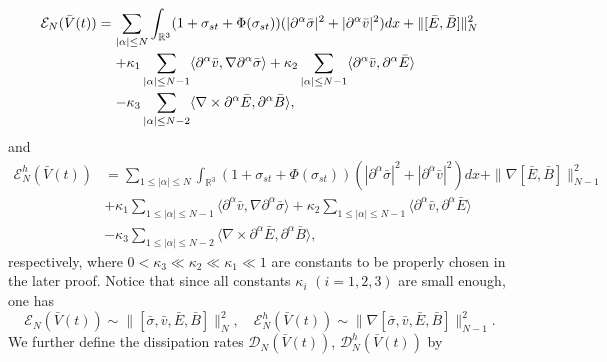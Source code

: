 \documentclass[11pt]{amsart}
\numberwithin{equation}{section}
\begin{document}
\begin{equation}\label{de.E}
\arraycolsep=1.5pt
\begin{array}{rl}
\mathcal{E}_{N}(\bar{V}(t))=&\displaystyle\sum_{|\alpha|\leq
N}\int_{\mathbb{R}^3}(1+\sigma_{st}+\Phi(\sigma_{st}))
(|\partial^{\alpha}\bar{\sigma}|^2+|\partial^{\alpha}\bar{v}|^2)dx+\|[\bar{E},\bar{B}]\|_{N}^{2}\\[5mm]
&\displaystyle+\kappa_{1}\sum_{|\alpha|\leq N-1} \langle
\partial^{\alpha}\bar{v},\nabla\partial^{\alpha}\bar{\sigma}\rangle+\kappa_{2}\sum_{|\alpha|\leq N-1}\langle
\partial^{\alpha}\bar{v},\partial^{\alpha}\bar{E}\rangle\\[5mm]
&\displaystyle-\kappa_{3}\sum_{|\alpha|\leq N-2}\langle \nabla
\times
\partial^{\alpha}\bar{E},\partial^{\alpha}\bar{B}\rangle,
\end{array}
\end{equation}
and
\begin{equation}\label{de.Eh}
\begin{aligned}
\mathcal{E}_{N}^{h}(\bar{V}(t))&=\sum_{1\leq|\alpha|\leq
N}\int_{\mathbb{R}^3}(1+\sigma_{st}+\Phi(\sigma_{st}))
(|\partial^{\alpha}\bar{\sigma}|^2+|\partial^{\alpha}\bar{v}|^2)dx+\|\nabla[\bar{E},\bar{B}]\|_{N-1}^{2}\\
&+\kappa_{1}\sum_{1\leq|\alpha|\leq N-1}\langle
\partial^{\alpha}\bar{v},\nabla\partial^{\alpha}\bar{\sigma}\rangle+\kappa_{2}\sum_{1\leq|\alpha|\leq N-1}\langle
\partial^{\alpha}\bar{v},\partial^{\alpha}\bar{E}\rangle\\[3mm]
&-\kappa_{3}\sum_{1\leq |\alpha|\leq N-2}\langle \nabla
   \times\partial^{\alpha}\bar{E},\partial^{\alpha}\bar{B}\rangle,
\end{aligned}
\end{equation}
respectively, where $0<\kappa_{3}\ll\kappa_{2}\ll\kappa_{1}\ll 1$
are constants to be properly chosen in the later proof. Notice that
since all constants $\kappa_i$ $(i=1,2,3)$ are small enough, one has
\begin{equation*}
    \mathcal {E}_{N}(\bar{V}(t))\sim
\|[\bar{\sigma},\bar{v},\bar{E},\bar{B}] \|_{N}^{2},\quad \mathcal
{E}_{N}^{h}(\bar{V}(t))\sim \|\nabla
[\bar{\sigma},\bar{v},\bar{E},\bar{B}]  \|_{N-1}^{2}.
\end{equation*}
We further define the dissipation rates $\mathcal
{D}_{N}(\bar{V}(t))$, $\mathcal {D}_{N}^{h}(\bar{V}(t))$ by
\end{document}
